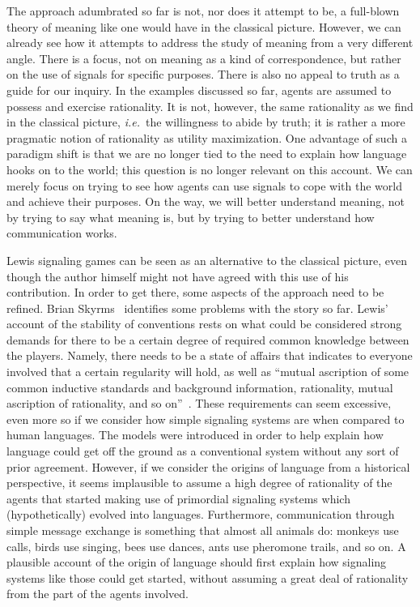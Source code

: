 \documentclass[a4paper]{article}
\begin{document}
The approach adumbrated so far is not, nor does it attempt to be, a full-blown theory of meaning like one would have in the classical picture.
However, we can already see how it attempts to address the study of meaning from a very different angle.
There is a focus, not on meaning as a kind of correspondence, but rather on the use of signals for specific purposes.
There is also no appeal to truth as a guide for our inquiry.
In the examples discussed so far, agents are assumed to possess and exercise rationality.
It is not, however, the same rationality as we find in the classical picture, \emph{i.e.}~the willingness to abide by truth; it is rather a more pragmatic notion of rationality as utility maximization.
One advantage of such a paradigm shift is that we are no longer tied to the need to explain how language hooks on to the world; this question is no longer relevant on this account.
We can merely focus on trying to see how agents can use signals to cope with the world and achieve their purposes.
On the way, we will better understand meaning, not by trying to say what meaning is, but by trying to better understand how communication works.

Lewis signaling games can be seen as an alternative to the classical picture, even though the author himself might not have agreed with this use of his contribution.
In order to get there, some aspects of the approach need to be refined.
Brian Skyrms~\parencite*[80--104]{skyrms_evolution_1996} identifies some problems with the story so far.
Lewis' account of the stability of conventions rests on what could be considered strong demands for there to be a certain degree of required common knowledge between the players.
Namely, there needs to be a state of affairs that indicates to everyone involved that a certain regularity will hold, as well as ``mutual ascription of some common inductive standards and background information, rationality, mutual ascription of rationality, and so on''~\parencite*[56--57]{lewis_convention_1969}.
These requirements can seem excessive, even more so if we consider how simple signaling systems are when compared to human languages.
The models were introduced in order to help explain how language could get off the ground as a conventional system without any sort of prior agreement.
However, if we consider the origins of language from a historical perspective, it seems implausible to assume a high degree of rationality of the agents that started making use of primordial signaling systems which (hypothetically) evolved into languages.
Furthermore, communication through simple message exchange is something that almost all animals do: monkeys use calls, birds use singing, bees use dances, ants use pheromone trails, and so on.
A plausible account of the origin of language should first explain how signaling systems like those could get started, without assuming a great deal of rationality from the part of the agents involved.
\end{document}
